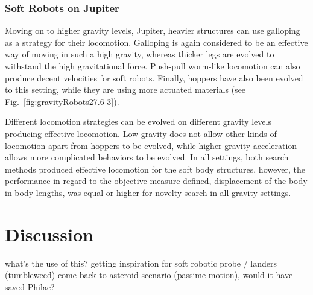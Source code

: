 \documentclass{sig-alternate}
\begin{document}
\subsubsection*{Soft Robots on Jupiter}

Moving on to higher gravity levels, Jupiter, heavier structures can use galloping as a strategy for their locomotion. Galloping is again considered to be an effective way of moving in such a high gravity, whereas thicker legs are evolved to withstand the high gravitational force. Push-pull worm-like locomotion can also produce decent velocities for soft robots. Finally, hoppers have also been evolved to this setting, while they are using more actuated materials (see Fig.~\ref{fig:gravityRobots27.6-3}).


Different locomotion strategies can be evolved on different gravity levels producing effective locomotion. Low gravity does not allow other kinds of locomotion apart from hoppers to be evolved, while higher gravity acceleration allows more complicated behaviors to be evolved. In all settings, both search methods produced effective locomotion for the soft body structures, however, the performance in regard to the objective measure defined, displacement of the body in body lengths, was equal or higher for novelty search in all gravity settings.



\section{Discussion}
what's the use of this?
getting inspiration for soft robotic probe / landers (tumbleweed)
come back to asteroid scenario (passime motion), would it have saved Philae?

\end{document}
